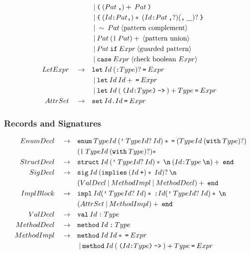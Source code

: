 \documentclass[a4paper, 12pt]{article}
\newcommand{\sepbar}{\: | \:}	%
\newcommand{\substo}{\quad\rightarrow\quad}
\newcommand{\uscore}{\underline{\hspace{0.3cm}}}
\renewcommand{\tt}{\texttt}
\newcommand{\la}{\langle}
\newcommand{\ra}{\rangle}
\begin{document}
\begin{align*}
& \sepbar \tt{(} \: ( Pat\:\tt{,})+\: Pat\: \tt{)}\\
& \sepbar \tt{\{} \: (Id\tt{:}Pat\tt{,})*\: (Id\tt{:}Pat\: \tt{,}?) (\tt{,}\:\uscore)?\: \tt{\}}\\
& \sepbar \sim\:Pat \:\la\text{pattern complement}\ra\\
& \sepbar Pat\: (\tt{|}\: Pat)+\:\la\text{pattern union}\ra\\
& \sepbar Pat\:\tt{if}\: Expr\:\la\text{guarded pattern}\ra\\
& \sepbar \tt{case}\: Expr\:\la\text{check boolean }Expr\ra\\
LetExpr \substo& \tt{let}\: Id \:(\tt{:} Type)? \: \tt{=} \: Expr\\
&\sepbar \tt{let}\: Id \: Id+ \: \tt{=} \: Expr\\
&\sepbar \tt{let}\: Id \: (\: \tt{(} Id\tt{:} Type \tt{)}\: \tt{->} \:)+ Type \: \tt{=}\: Expr\\
AttrSet \substo& \tt{set}\: Id\tt{.}Id\: \tt{=} \:Expr\\
\end{align*}
\subsubsection{Records and Signatures}
\begin{align*}
EnumDecl \substo& \tt{enum}\: TypeId \: (\tt{'}\: TypeId?\: Id)* \: \texttt{=} \: (TypeId \: (\texttt{with}\: Type)?)\\
&(\texttt{|}\:TypeId \: (\texttt{with}\: Type)?)*\\
StructDecl \substo& \tt{struct}\: Id \: (\tt{'}\: TypeId?\: Id)*\: \tt{\symbol{92}n} \: (Id\tt{:} Type\: \tt{\symbol{92}n})+\: \tt{end}\\
SigDecl \substo& \tt{sig}\: Id\: ( \tt{implies} \: (Id \: \tt{+})*\: Id)? \:  \tt{\symbol{92}n}\\
&(ValDecl \sepbar MethodImpl \sepbar MethodDecl)+\: \tt{end}\\
ImplBlock \substo& \tt{impl}\: Id (\tt{'}\: TypeId?\: Id)* \: \tt{:} Id (\tt{'}\: TypeId?\: Id)* \: \tt{\symbol{92}n}\\
&(AttrSet \sepbar MethodImpl)+\: \tt{end} \\
ValDecl \substo& \tt{val} \: Id\: \tt{:}\: Type \\
MethodDecl \substo& \tt{method} \: Id\: \tt{:} \: Type\\\
MethodImpl \substo& \tt{method} \: Id\: Id*\: \tt{=}\: Expr\\
&\sepbar \tt{method}\: Id \: (\: \tt{(} Id\tt{:} Type \tt{)}\: \tt{->} \:)+ Type \: \tt{=}\: Expr\\
\end{align*}
\end{document}
